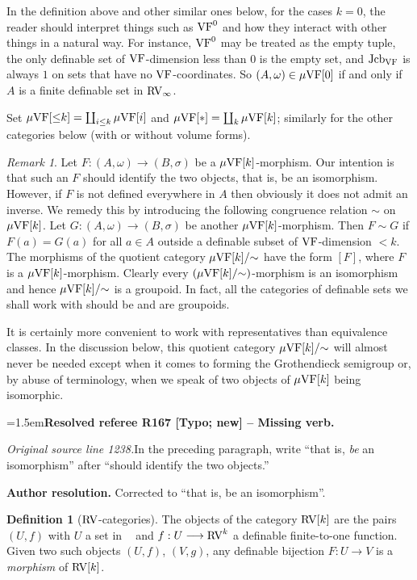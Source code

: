 \documentclass[12pt]{amsart}
\newcommand{\ResolvedRefereeRemark}[5]{%
  \par\medskip\begingroup\normalfont\small\color{gray}%
  \emergencystretch=1.5em\noindent\textbf{Resolved referee R#1 [#2] -- #3.}\par\nobreak\noindent #4\par
  \medskip\color{ResolutionGreen}\noindent\textbf{Author resolution.} #5\par
  \endgroup\medskip
}
\newcommand{\memph}[1]{{\color{magenta}\emph{#1}}}
\theoremstyle{plain}
\theoremstyle{definition}
\newtheorem{defn}[thm]{Definition}
\theoremstyle{remark}
\newtheorem{rem}[thm]{Remark}
\numberwithin{equation}{section}
\theoremstyle{plain}
\newcommand{\VF}{\textup{VF}}
\newcommand{\RV}{\textup{RV}}
\DeclareMathOperator{\jcb}{Jcb}
\newcommand{\0}{\emptyset}
\newcommand{\fun}{\longrightarrow}
\newcommand{\mVF}{{\mu}{\VF}}
\newcommand{\mgVF}{{\mu} {\VF}}
\DeclareMathOperator{\RVV}{RV_\infty}
\begin{document}
In the definition above and other similar ones below, for the cases $k =0$, the reader should interpret things such as $\VF^0$ and how they interact with other things in a natural way. For instance, $\VF^0$ may be treated as the empty tuple, the only definable set of $\VF$-dimension less than $0$ is the empty set, and $\jcb_{\VF}$ is always $1$ on sets that have no $\VF$-coordinates. So $(A, \omega) \in \mgVF[0]$ if and only if $A$ is a finite definable set in $\RV_\infty$.

Set $\mgVF[{\leq} k] = \coprod_{i \leq k} \mgVF[i]$ and $\mgVF[*] = \coprod_{k} \mVF[k]$; similarly for the other categories below (with or without volume forms).


\begin{rem}\label{mor:equi}
Let $F : (A, \omega) \fun (B, \sigma)$ be a $\mgVF[k]$-morphism. Our intention is that such an $F$ should identify the two objects, that is, be an isomorphism. However, if $F$ is not defined everywhere in $A$ then obviously it does not admit an inverse. We remedy this by introducing the following congruence relation $\sim$ on $\mgVF[k]$. Let $G : (A, \omega) \fun (B, \sigma)$ be another $\mgVF[k]$-morphism. Then $F \sim G$ if $F(a) = G(a)$ for all $a \in A$  outside a definable subset  of $\VF$-dimension $< k$. The morphisms of the quotient category $\mgVF[k] /{\sim}$ have the form $[F]$, where $F$ is a $\mgVF[k]$-morphism. Clearly every $(\mgVF[k] / {\sim})$-morphism is an isomorphism and hence $\mgVF[k] / {\sim}$ is a groupoid. In fact, all the categories of definable sets we shall work with should be and are groupoids.

It is certainly more convenient to work with representatives than equivalence classes. In the discussion below, this quotient category $\mgVF[k] /{\sim}$ will almost never be needed except when it comes to forming the Grothendieck semigroup or, by abuse of terminology, when we speak of two objects of $\mgVF[k]$ being isomorphic.

\ResolvedRefereeRemark{167}{Typo; new}{Missing verb}{%
\textit{Original source line 1238.}\quad In the preceding paragraph, write ``that is, \emph{be} an isomorphism'' after ``should identify the two objects.''
}{Corrected to ``that is, be an isomorphism''.}
\end{rem}



\begin{defn}[$\RV$-categories]\label{defn:c:RV:cat}
The objects of the category $\RV[k]$ are the pairs $(U, f)$ with $U$ a set in $\RVV$ and $f : U \fun \RV^k$ a definable finite-to-one function. Given two such objects $(U, f)$, $(V, g)$, any definable bijection $F : U \fun V$ is a \memph{morphism} of $\RV[k]$.
\end{defn}
\end{document}
